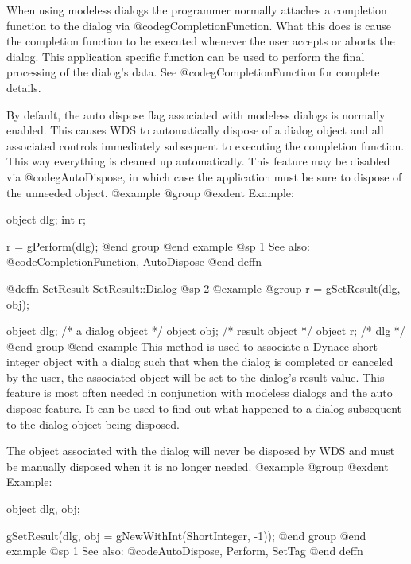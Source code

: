 When using modeless dialogs the programmer normally attaches a completion
function to the dialog via @code{gCompletionFunction}.  What this does
is cause the completion function to be executed whenever the user
accepts or aborts the dialog.  This application specific function can be
used to perform the final processing of the dialog's data.  See
@code{gCompletionFunction} for complete details.

By default, the auto dispose flag associated with modeless dialogs is
normally enabled.  This causes WDS to automatically dispose of a dialog
object and all associated controls immediately subsequent to executing
the completion function.  This way everything is cleaned up automatically.
This feature may be disabled via @code{gAutoDispose}, in which case the
application must be sure to dispose of the unneeded object.
@example
@group
@exdent Example:

object  dlg;
int     r;

r = gPerform(dlg);
@end group
@end example
@sp 1
See also:  @code{CompletionFunction, AutoDispose}
@end deffn













@deffn {SetResult} SetResult::Dialog
@sp 2
@example
@group
r = gSetResult(dlg, obj);

object  dlg;    /*  a dialog object  */
object  obj;    /*  result object    */
object  r;      /*  dlg              */
@end group
@end example
This method is used to associate a Dynace short integer object with a
dialog such that when the dialog is completed or canceled by the user,
the associated object will be set to the dialog's result value.  This
feature is most often needed in conjunction with modeless dialogs and
the auto dispose feature.  It can be used to find out what happened to a
dialog subsequent to the dialog object being disposed.

The object associated with the dialog will never be disposed by WDS
and must be manually disposed when it is no longer needed.
@example
@group
@exdent Example:

object  dlg, obj;

gSetResult(dlg, obj = gNewWithInt(ShortInteger, -1));
@end group
@end example
@sp 1
See also:  @code{AutoDispose, Perform, SetTag}
@end deffn










